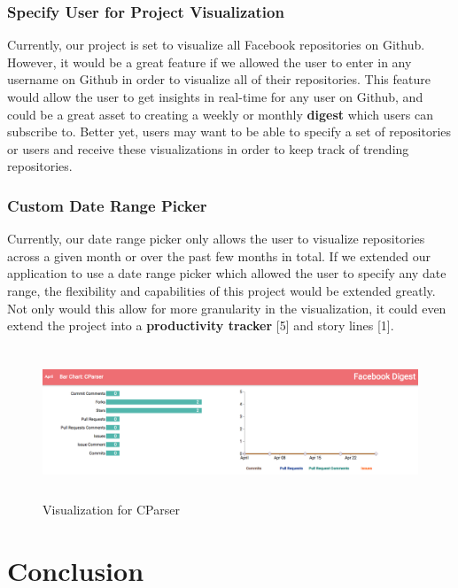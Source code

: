 \documentclass{article}
\begin{document}
\subsubsection {Specify User for Project Visualization}

Currently, our project is set to visualize all Facebook repositories on Github. However, it would be a great feature if we allowed the user to enter in any username on Github in order to visualize all of their repositories. This feature would allow the user to get insights in real-time for any user on Github, and could be a great asset to creating a weekly or monthly \textbf{digest} which users can subscribe to. Better yet, users may want to be able to specify a set of repositories or users and receive these visualizations in order to keep track of trending repositories.

\subsubsection {Custom Date Range Picker}

Currently, our date range picker only allows the user to visualize repositories across a given month or over the past few months in total. If we extended our application to use a date range picker which allowed the user to specify any date range, the flexibility and capabilities of this project would be extended greatly. Not only would this allow for more granularity in the visualization, it could even extend the project into a \textbf{productivity tracker} [5] and story lines [1].

\begin{figure}[t!]
\centering
\includegraphics[height=4.5cm, width=17cm]{cparse}
\caption{Visualization for CParser}
\end{figure}

\section {Conclusion}
\end{document}
